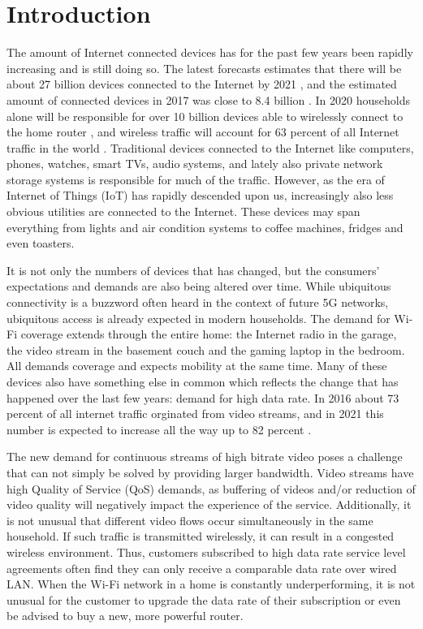 \chapter{Introduction}
The amount of Internet connected devices has for the past few years been rapidly increasing and is still doing so. The latest forecasts
estimates that there will be about 27 billion devices connected to the Internet by 2021 \cite{CiscoVNI2017}, and the estimated amount of 
connected devices in 2017 was close to 8.4 billion \cite{Gartner}. In 2020 households alone will be responsible for over 10 billion devices
able to wirelessly connect to the home router \cite{wifialliance}, and wireless traffic will account for 63 percent of all Internet traffic in the world \cite{CiscoVNI2017}. 
Traditional devices connected to the Internet like computers, phones, watches, smart TVs, audio systems, and lately also private network storage systems is responsible
for much of the traffic. However, as the era of Internet of Things (IoT) has rapidly descended upon us, increasingly also less obvious utilities are connected to the Internet.
These devices may span everything from lights and air condition systems to coffee machines, fridges and even toasters.

It is not only the numbers of devices that has changed, but the consumers' expectations and demands are also being altered over time. 
While ubiquitous connectivity is a buzzword often heard in the context of future 5G networks, ubiquitous access is already expected in
modern households. The demand for Wi-Fi coverage extends through the entire home: the Internet radio in the garage, the video stream in the basement
couch and the gaming laptop in the bedroom. All demands coverage and expects mobility at the same time. Many of these devices also have something else in
common which reflects the change that has happened over the last few years: demand for high data rate. In 2016 about 73 percent of all internet traffic orginated from video
streams, and in 2021 this number is expected to increase all the way up to 82 percent \cite{CiscoVNI2017}. 


The new demand for continuous streams of high bitrate video poses a challenge that can not simply be solved by providing larger bandwidth. Video streams
have high Quality of Service (QoS) demands, as buffering of videos and/or reduction of video quality will negatively impact the experience of the service.
Additionally, it is not unusual that different video flows occur simultaneously in the same household. If such traffic is transmitted wirelessly,
it can result in a congested wireless environment. Thus, customers subscribed to high data rate service level agreements often find they can only receive a comparable data rate over wired LAN.
When the Wi-Fi network in a home is constantly underperforming, it is not unusual for the customer to upgrade the data rate of their subscription or even be advised to buy a new, more powerful router. 

